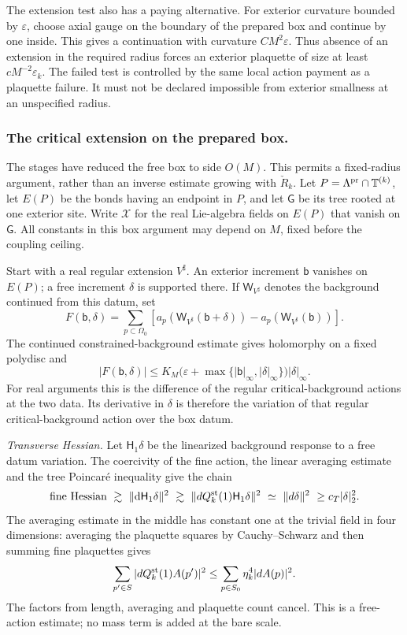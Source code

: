 \documentclass[11pt,letterpaper,reqno]{amsart}
\theoremstyle{definition}
\theoremstyle{remark}
\begin{document}
The extension test also has a paying
alternative. For exterior curvature
bounded by $\varepsilon$, choose axial
gauge on the boundary of the prepared
box and continue by one inside. This
gives a continuation with curvature
$CM^2\varepsilon$. Thus absence of
an extension in the required radius
forces an exterior plaquette of size
at least $cM^{-2}\varepsilon_k$.
The failed test is controlled by the
same local action payment as a
plaquette failure. It must not be
declared impossible from exterior
smallness at an unspecified radius.

\subsubsection*{The critical extension on the prepared box.}

The stages have reduced the free box to side \(O(M)\).
This permits a fixed-radius argument, rather than an
inverse estimate growing with \(\check R_k\).
Let \(P=\Lambda^{\rm pr}\cap\mathbb T^{(k)}\), let
\(E(P)\) be the bonds having an endpoint in \(P\),
and let \(\mathsf G\) be its tree rooted at one
exterior site. Write \(\mathcal X\) for the real
Lie-algebra fields on \(E(P)\) that vanish on
\(\mathsf G\). All constants in this box argument
may depend on \(M\), fixed before the coupling
ceiling.

Start with a real regular extension \(V^\sharp\).
An exterior increment \(\mathsf b\) vanishes on
\(E(P)\); a free increment \(\delta\) is supported
there. If \(\mathsf W_{V^\sharp}\) denotes the
background continued from this datum, set
\[
 F(\mathsf b,\delta)=
 \sum_{p\subset\Omega_0}
 \left[a_p(\mathsf W_{V^\sharp}(\mathsf b+\delta))
                  -a_p(\mathsf W_{V^\sharp}(\mathsf b))\right].
\]
The continued constrained-background estimate gives
holomorphy on a fixed polydisc and
\begin{equation}\label{eq:main-box-action-difference}
 |F(\mathsf b,\delta)|
 \le K_M\bigl(\varepsilon+
             \max\{|\mathsf b|_\infty,|\delta|_\infty\}\bigr)
                                                |\delta|_\infty .
\end{equation}
For real arguments this is the difference of the
regular critical-background actions at the two data. Its derivative
in \(\delta\) is therefore the variation of that
regular critical-background action over the box datum.

\emph{Transverse Hessian.}
Let \(\mathsf H_1\delta\) be the linearized
background response to a free datum variation.
The coercivity of the fine action, the linear
averaging estimate and the tree Poincar\'e
inequality give the chain
\[
 \text{fine Hessian}\ \gtrsim\
       \|\mathrm d\mathsf H_1\delta\|^2
 \ \gtrsim\ \|dQ_k^{\rm st}(1)\mathsf H_1\delta\|^2
 \ \simeq\ \|d\delta\|^2
 \ \ge c_T|\delta|_2^2 .
\]
The averaging estimate in the middle has constant
one at the trivial field in four dimensions:
averaging the plaquette squares by Cauchy--Schwarz
and then summing fine plaquettes gives
\[
 \sum_{p'\in S}|dQ_k^{\rm st}(1)A(p')|^2
 \le\sum_{p\in S_0}\eta_k^4|dA(p)|^2.
\]
The factors from length, averaging and plaquette
count cancel. This is a free-action estimate; no
mass term is added at the bare scale.
\end{document}
